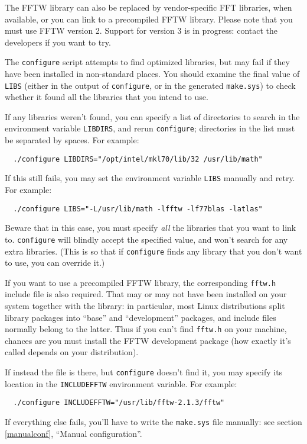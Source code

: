 \documentclass[12pt,a4paper]{article}
\begin{document}
The FFTW library can also be replaced by vendor-specific FFT
libraries, when available, or you can link to a precompiled FFTW
library.  Please note that you must use FFTW version 2.  Support for
version 3 is in progress: contact the developers if you want to try.

The \texttt{configure} script attempts to find optimized libraries,
but may fail if they have been installed in non-standard places.
You should examine the final value of \texttt{LIBS} (either in the
output of \texttt{configure}, or in the generated \texttt{make.sys})
to check whether it found all the libraries that you intend to use.

If any libraries weren't found, you can specify a list of directories
to search in the environment variable \texttt{LIBDIRS}, and rerun
\texttt{configure}; directories in the list must be separated by
spaces.  For example:
\begin{verbatim}
  ./configure LIBDIRS="/opt/intel/mkl70/lib/32 /usr/lib/math"
\end{verbatim}
If this still fails, you may set the environment variable
\texttt{LIBS} manually and retry.  For example:
\begin{verbatim}
  ./configure LIBS="-L/usr/lib/math -lfftw -lf77blas -latlas"
\end{verbatim}
Beware that in this case, you must specify \emph{all} the libraries
that you want to link to.  \texttt{configure} will blindly accept the
specified value, and won't search for any extra libraries.  (This is
so that if \texttt{configure} finds any library that you don't want to
use, you can override it.)

If you want to use a precompiled FFTW library, the corresponding
\texttt{fftw.h} include file is also required.
That may or may not have been installed on your system together with
the library: in particular, most Linux distributions split library
packages into ``base'' and ``development'' packages, and include files
normally belong to the latter.
Thus if you can't find \texttt{fftw.h} on your machine, chances are
you must install the FFTW development package (how exactly it's called
depends on your distribution).

If instead the file is there, but \texttt{configure} doesn't find it,
you may specify its location in the \texttt{INCLUDEFFTW} environment
variable.
For example:
\begin{verbatim}
  ./configure INCLUDEFFTW="/usr/lib/fftw-2.1.3/fftw"
\end{verbatim}
If everything else fails, you'll have to write the \texttt{make.sys}
file manually: see section \ref{manualconf}, ``Manual configuration''.
\end{document}
